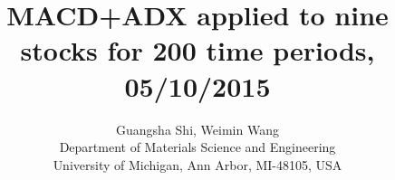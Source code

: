 \documentclass{article} %
\title{MACD+ADX applied to nine stocks for 200 time periods, 05/10/2015}
\author{
Guangsha Shi, Weimin Wang\\
Department of Materials Science and Engineering\\
University of Michigan, Ann Arbor, MI-48105, USA\\
}
\begin{document}
\maketitle




\small
%
\normalsize
\end{document}

